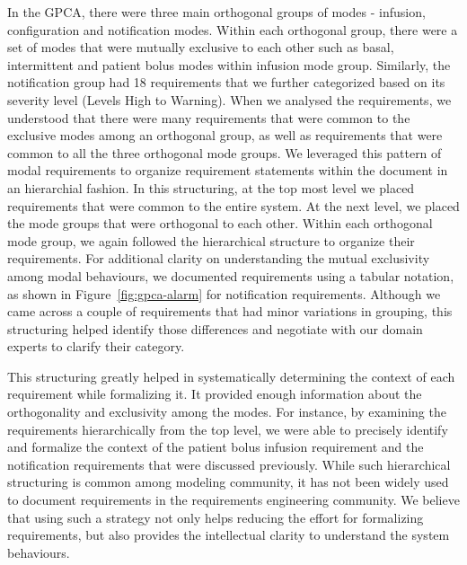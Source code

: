 In the GPCA, there were three main orthogonal groups of modes - infusion, configuration and notification modes. Within each orthogonal group, there were a set of modes that were mutually exclusive to each other such as basal, intermittent and patient bolus modes within infusion mode group. Similarly, the notification group had 18 requirements that we further categorized based on its severity level (Levels High to Warning). When we analysed the requirements, we understood that there were many requirements that were common to the exclusive modes among an orthogonal group, as well as requirements that were common to all the three orthogonal mode groups. We leveraged this pattern of modal requirements to organize requirement statements within the document in an hierarchial fashion. In this structuring, at the top most level we placed requirements that were common to the entire system. At the next level, we placed the mode groups that were orthogonal to each other. Within each orthogonal mode group, we again followed the hierarchical structure to organize their requirements. %
For additional clarity on understanding the mutual exclusivity among modal behaviours, we documented requirements using a tabular notation, as shown in Figure~\ref{fig:gpca-alarm} for notification requirements. Although we came across a couple of requirements that had minor variations in grouping, this structuring helped identify those differences and negotiate with our domain experts to clarify their category.
%
%
%


This structuring greatly helped in systematically determining the context of each requirement while formalizing it. It provided enough information about the orthogonality and exclusivity among the modes. For instance, by examining the requirements hierarchically from the top level, we were able to precisely identify and formalize the context of the patient bolus infusion requirement and the notification requirements that were discussed previously. While such hierarchical structuring is common among modeling community, it has not been widely used to document requirements in the requirements engineering community. We believe that using such a strategy not only helps reducing the effort for formalizing requirements, but also provides the intellectual clarity to understand the system behaviours.

